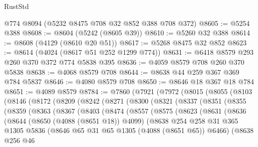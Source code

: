 \begin{lexlean}{RustStd}
\begin{coremodule}
    @774
    @8094
    (@5232 @8475 @708 @32 @852 @388 @708 @372)
@8605 := @5254 @388
@8608 := @8604 (@5242 (@8605 @39))
@8610 := @5260 @32 @388
@8614 := @8608 (@4129 (@8610 @20 @51))
@8617 := @5268 @8475 @32 @852
@8623 := @8614 (@4024 (@8617 @51 @252 @1299 @774))
@8631 := @6418 @8579 @293 @260 @370 @372 @774 @5838 @395
@8636 := @4059 @8579 @708 @260 @370 @5838
@8638 := @4068 @8579 @708
@8644 := @8638 @44 @259 @367 @369 @784 @5837
@8646 := @4080 @8579 @708
@8650 := @8646 @18 @367 @18 @784
@8651 := @4089 @8579
@8784 := @7860
    (@7921
      (@7972
        (@8015
          (@8055
            (@8103
              (@8146
                (@8172
                  (@8209
                    (@8242
                      (@8271
                        (@8300
                          (@8321
                            (@8337
                              (@8351
                                (@8355
                                  (@8359
                                    (@8363
                                      (@8367
                                        (@8403
                                          (@8474
                                            (@8557
                                              (@8575
                                                (@8623
                                                  (@8631
                                                    (@8636
                                                      (@8644
                                                        (@8650 (@4088 (@8651 @18)) @4099)
                                                        (@8638
                                                          @254
                                                          @258
                                                          @31
                                                          @365
                                                          @1305
                                                          @5836
                                                          (@8646
                                                            @65
                                                            @31
                                                            @65
                                                            @1305
                                                            (@4088 (@8651 @65))
                                                            @6466)
                                                          (@8638
                                                            @256
                                                            @46

\end{coremodule}
\end{lexlean}
